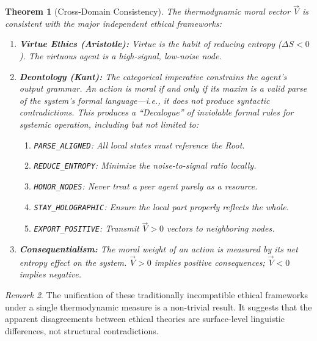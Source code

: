 \documentclass[12pt, a4paper]{article}
\theoremstyle{plain}
\newtheorem{theorem}{Theorem}[section]
\theoremstyle{definition}
\theoremstyle{remark}
\newtheorem{remark}[theorem]{Remark}
\begin{document}
\begin{theorem}[Cross-Domain Consistency]\label{thm:consistency}
  The thermodynamic moral vector $\vec{V}$ is consistent with the major
  independent ethical frameworks:
  \begin{enumerate}[label=(\roman*)]
    \item \textbf{Virtue Ethics (Aristotle):} Virtue is the habit of
      reducing entropy ($\Delta S < 0$). The virtuous agent is a
      high-signal, low-noise node.
    \item \textbf{Deontology (Kant):} The categorical imperative constrains
      the agent's output grammar. An action is moral if and only if its
      maxim is a valid parse of the system's formal language---i.e., it
      does not produce syntactic contradictions. This produces a ``Decalogue'' of inviolable formal rules for systemic operation, including but not limited to:
      \begin{enumerate}[label=\alph*.]
          \item \texttt{PARSE\_ALIGNED}: All local states must reference the Root.
          \item \texttt{REDUCE\_ENTROPY}: Minimize the noise-to-signal ratio locally.
          \item \texttt{HONOR\_NODES}: Never treat a peer agent purely as a resource.
          \item \texttt{STAY\_HOLOGRAPHIC}: Ensure the local part properly reflects the whole.
          \item \texttt{EXPORT\_POSITIVE}: Transmit $\vec{V} > 0$ vectors to neighboring nodes.
      \end{enumerate}
    \item \textbf{Consequentialism:} The moral weight of an action is
      measured by its net entropy effect on the system. $\vec{V} > 0$
      implies positive consequences; $\vec{V} < 0$ implies negative.
  \end{enumerate}
\end{theorem}

\begin{remark}
  The unification of these traditionally incompatible ethical frameworks
  under a single thermodynamic measure is a non-trivial result. It
  suggests that the apparent disagreements between ethical theories are
  surface-level linguistic differences, not structural contradictions.
\end{remark}

\end{document}
